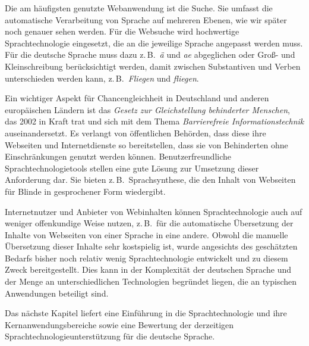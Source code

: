 \documentclass[]{../../metanetpaper}
\begin{document}
\begin{multicols}{2}

Die am häufigsten genutzte Webanwendung ist die Suche. Sie umfasst die automatische Verarbeitung von Sprache auf mehreren Ebenen, wie wir später noch genauer sehen werden. Für die Websuche wird hochwertige Sprachtechnologie eingesetzt, die an die jeweilige Sprache angepasst werden muss. Für die deutsche Sprache muss dazu z.\,B.~\textit{ä} und \textit{ae} abgeglichen oder Groß- und Kleinschreibung berücksichtigt werden, damit zwischen Substantiven und Verben unterschieden werden kann, z.\,B.~\textit{Fliegen} und \textit{fliegen}. 


Ein wichtiger Aspekt für Chancengleichheit in Deutschland und anderen europäischen Ländern ist das \textit{Gesetz zur Gleichstellung behinderter Menschen}, das 2002 in Kraft trat und sich mit dem Thema \textit{Barrierefreie Informationstechnik} auseinandersetzt. Es verlangt von öffentlichen Behörden, dass diese ihre Webseiten und Internetdienste so bereitstellen, dass sie von Behinderten ohne Einschränkungen genutzt werden können. Benutzerfreundliche Sprachtechnologietools stellen eine gute Lösung zur Umsetzung dieser Anforderung dar. Sie bieten z.\,B.~Sprachsynthese, die den Inhalt von Webseiten für Blinde in gesprochener Form wiedergibt.

Internetnutzer und Anbieter von Webinhalten können Sprachtechnologie auch auf weniger offenkundige Weise nutzen, z.\,B.~für die automatische Übersetzung der Inhalte von Webseiten von einer Sprache in eine andere. Obwohl die manuelle Übersetzung dieser Inhalte sehr kostspielig ist, wurde angesichts des geschätzten Bedarfs bisher noch relativ wenig Sprachtechnologie entwickelt und zu diesem Zweck bereitgestellt. Dies kann in der Komplexität der deutschen Sprache und der Menge an unterschiedlichen Technologien begründet liegen, die an typischen Anwendungen beteiligt sind.

Das nächste Kapitel liefert eine Einführung in die Sprachtechnologie und ihre Kernanwendungsbereiche sowie eine Bewertung der derzeitigen Sprachtechnologieunterstützung für die deutsche Sprache.

\end{multicols}

\clearpage

\end{document}
